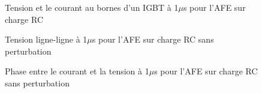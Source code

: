 \begin{figure}[htb]
\centering
{}
\caption{Tension et le courant au bornes d'un IGBT à 1$\mu$s pour l'AFE sur charge RC}
\label{AF_RC_igbt}
\end{figure}

\begin{figure}[htb]
\centering
{}
\caption{Tension ligne-ligne à 1$\mu$s pour l'AFE sur charge RC sans perturbation}
\label{AF_RC_ten_L}
\end{figure}

\begin{figure}[htb]
\centering
{}
\caption{Phase entre le courant et la tension à 1$\mu$s pour l'AFE sur charge RC sans perturbation}
\label{AF_RC_PH}
\end{figure}


